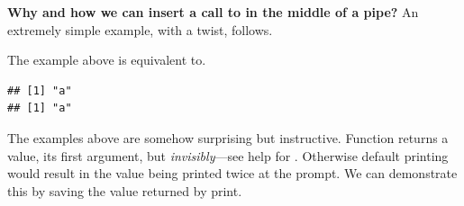 \documentclass[krantz2]{krantz}\usepackage{knitr}%
\begin{document}
\begin{explainbox}
\textbf{Why and how we can insert a call to  in the middle of a pipe?} An extremely simple example, with a twist, follows.

\begin{knitrout}\footnotesize
{}\color{fgcolor}
\end{knitrout}

The example above is equivalent to.

\begin{knitrout}\footnotesize
{}\color{fgcolor}\begin{kframe}
\begin{alltt}
\hlstd{(}\hlstd{(}\hlstd{))}
\end{alltt}
\begin{verbatim}
## [1] "a"
## [1] "a"
\end{verbatim}
\end{kframe}
\end{knitrout}

The examples above are somehow surprising but instructive. Function  returns a value, its first argument, but \emph{invisibly}---see help for . Otherwise default printing would result in the value being printed twice at the \Rlang prompt. We can demonstrate this by saving the value returned by print.


\end{explainbox}
\end{document}
